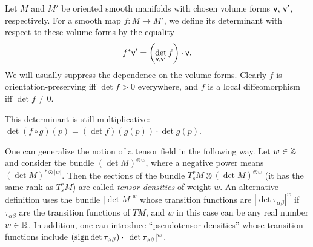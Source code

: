 \begin{defn}
Let $M$ and $M'$ be oriented smooth manifolds with chosen volume forms $\mathsf{v}$, $\mathsf{v}'$, respectively. For a smooth map $f:M\to M'$, we define its determinant with respect to these volume forms by the equality
\[f^\ast \mathsf{v}'=\left(\det_{\mathsf{v},\mathsf{v}'}f\right)\cdot \mathsf{v}.\]
We will usually suppress the dependence on the volume forms. Clearly $f$ is orientation-preserving iff $\det f>0$ everywhere, and $f$ is a local diffeomorphism iff $\det f\neq 0$.

This determinant is still multiplicative: $\det(f\circ g)(p)=(\det f)(g(p))\cdot \det g(p)$.
\end{defn}

\begin{defn}\label{def tensor densities}
One can generalize the notion of a tensor field in the following way. Let $w\in\mathbb{Z}$ and consider the bundle $(\det M)^{\otimes w}$, where a negative power means $(\det M)^{\ast\otimes |w|}$. Then the sections of the bundle $T^r_s M\otimes (\det M)^{\otimes w}$ (it has the same rank as $T^r_s M$) are called \emph{tensor densities} of weight $w$. An alternative definition uses the bundle $\left|\det M\right|^{w}$ whose transition functions are $|\det\tau_{\alpha\beta}|^w$ if $\tau_{\alpha\beta}$ are the transition functions of $TM$, and $w$ in this case can be any real number $w\in\mathbb{R} $. In addition, one can introduce ``pseudotensor densities'' whose transition functions include $(\operatorname{sign}\det\tau_{\alpha\beta})\cdot |\det\tau_{\alpha\beta}|^w$.
\end{defn}

